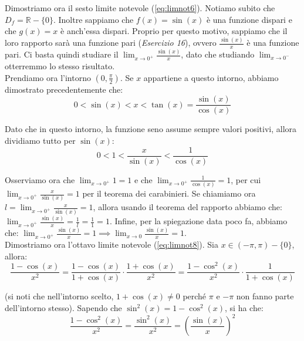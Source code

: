 \documentclass{article}
\begin{document}
\noindent Dimostriamo ora il sesto limite notevole (\ref{eq:limnot6}). Notiamo subito che $D_f = \mathbb{R} - \{0\}$. Inoltre sappiamo che $f(x) = \sin(x)$ è una funzione dispari e che $g(x) = x$ è anch'essa dispari. Proprio per questo motivo, sappiamo che il loro rapporto sarà una funzione pari (\textit{Esercizio 16}), ovvero $\frac{\sin(x)}{x}$ è una funzione pari. Ci basta quindi studiare il $\lim_{x \to 0^+} \frac{\sin(x)}{x}$, dato che studiando $\lim_{x \to 0^-}$ otterremmo lo stesso risultato.\\
Prendiamo ora l'intorno $(0, \frac{\pi}{2})$. Se $x$ appartiene a questo intorno, abbiamo dimostrato precedentemente che:
\begin{equation*}
    0 < \sin(x) < x < \tan(x) = \frac{\sin(x)}{\cos(x)}
\end{equation*}

\noindent Dato che in questo intorno, la funzione seno assume sempre valori positivi, allora dividiamo tutto per $\sin(x)$:
\begin{equation*}
    0 < 1 < \frac{x}{\sin(x)} < \frac{1}{\cos(x)}
\end{equation*}

\noindent Osserviamo ora che $\lim_{x \to 0^+} 1 = 1$ e che $\lim_{x \to 0^+} \frac{1}{\cos(x)} = 1$, per cui $\lim_{x \to 0^+} \frac{x}{\sin(x)} = 1$ per il teorema dei carabinieri. Se chiamiamo ora $l = \lim_{x \to 0^+} \frac{x}{\sin(x)} = 1$, allora usando il teorema del rapporto abbiamo che: $\lim_{x \to 0^+} \frac{\sin(x)}{x} = \frac{1}{l} = \frac{1}{1} = 1$. Infine, per la spiegazione data poco fa, abbiamo che: $\lim_{x \to 0^+} \frac{\sin(x)}{x} = 1 \implies \lim_{x \to 0} \frac{\sin(x)}{x} = 1$.\\

\noindent Dimostriamo ora l'ottavo limite notevole (\ref{eq:limnot8}). Sia $x \in (-\pi, \pi) - \{0\}$, allora:
\begin{equation*}
    \frac{1 - \cos(x)}{x^2} = \frac{1 - \cos(x)}{1 + \cos(x)} \cdot \frac{1 + \cos(x)}{x^2} = \frac{1 - \cos^2(x)}{x^2} \cdot \frac{1}{1 + \cos(x)}
\end{equation*}

\noindent (si noti che nell'intorno scelto, $1 + \cos(x) \neq 0$ perché $\pi$ e $-\pi$ non fanno parte dell'intorno stesso). Sapendo che $\sin^2(x) = 1 - \cos^2(x)$, si ha che:
\begin{equation*}
    \frac{1 - \cos^2(x)}{x^2} = \frac{\sin^2(x)}{x^2} = \left(\frac{\sin(x)}{x}\right)^2
\end{equation*}
\end{document}
